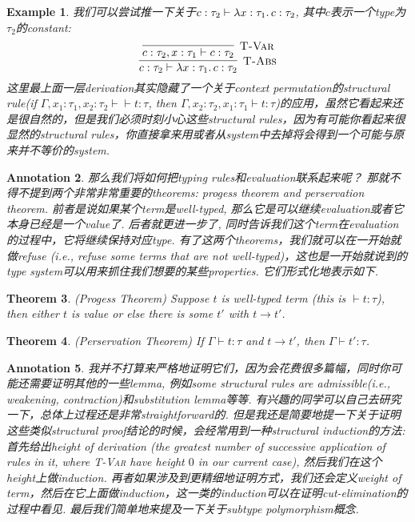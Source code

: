 \documentclass{article}
\newtheorem{theorem}{Theorem}[section]
\newtheorem{example}[theorem]{Example}
\newtheorem{annotation}[theorem]{Annotation}
\newcommand{\lam}[2]{\ensuremath{\lambda #1\ldotp #2}} %
\newcommand{\termtype}[2]{\ensuremath{#1:#2}}
\begin{document}
\begin{example}
\rm 我们可以尝试推一下关于$\termtype{c}{\tau_2}\vdash \termtype{\lam{\termtype{x}{\tau_1}}{c}}{\tau_2}$, 其中$c$表示一个type为$\tau_2$的constant:
\[
	\infer[\textsc{T-Abs}]{\termtype{c}{\tau_2}\vdash \termtype{\lam{\termtype{x}{\tau_1}}{c}}{\tau_2}}{\infer[\textsc{T-Var}]{\termtype{c}{\tau_2},\termtype{x}{\tau_1} \vdash \termtype{c}{\tau_2}}{}}
\]
这里最上面一层derivation其实隐藏了一个关于context permutation的structural rule(if $\Gamma,\termtype{x_1}{\tau_1},\termtype{x_2}{\tau_2} \vdash \vdash \termtype{t}{\tau}$, then $\Gamma,\termtype{x_2}{\tau_2},\termtype{x_1}{\tau_1} \vdash  \termtype{t}{\tau}$)的应用，虽然它看起来还是很自然的，但是我们必须时刻小心这些structural rules，因为有可能你看起来很显然的structural rules，你直接拿来用或者从system中去掉将会得到一个可能与原来并不等价的system.  
\end{example}

\begin{annotation}
\rm 那么我们将如何把typing rules和evaluation联系起来呢？ 那就不得不提到两个非常非常重要的theorems: \emph{progess theorem} and \emph{perservation theorem}. 前者是说如果某个term是well-typed, 那么它是可以继续evaluation或者它本身已经是一个value了. 后者就更进一步了, 同时告诉我们这个term在evaluation的过程中，它将继续保持对应type. 有了这两个theorems，我们就可以在一开始就做refuse (i.e., refuse some terms that are not well-typed)，这也是一开始就说到的type system可以用来抓住我们想要的某些properties. 它们形式化地表示如下.
\end{annotation}

\begin{theorem}
\rm (Progess Theorem) Suppose $t$ is well-typed term (this is $\vdash \termtype{t}{\tau}$), then either $t$ is value or else there is some $t'$ with $t \to t'$. 
\end{theorem}

\begin{theorem}
\rm (Perservation Theorem) If $\Gamma \vdash \termtype{t}{\tau}$ and $t \to t'$, then $\Gamma \vdash \termtype{t'}{\tau}$. 
\end{theorem}

\begin{annotation}
\rm 我并不打算来严格地证明它们，因为会花费很多篇幅，同时你可能还需要证明其他的一些lemma, 例如some structural rules are admissible(i.e., weakening, contraction)和substitution lemma等等. 有兴趣的同学可以自己去研究一下，总体上过程还是非常straightforward的. 但是我还是简要地提一下关于证明这些类似structural proof结论的时候，会经常用到一种structural induction的方法: 首先给出height of derivation (the greatest number of successive application of rules in it, where \textsc{T-Var} have height $0$ in our current case), 然后我们在这个height上做induction. 再者如果涉及到更精细地证明方式，我们还会定义weight of term，然后在它上面做induction，这一类的induction可以在证明cut-elimination的过程中看见. 最后我们简单地来提及一下关于\emph{subtype polymorphism}概念. 
\end{annotation}
\end{document}
